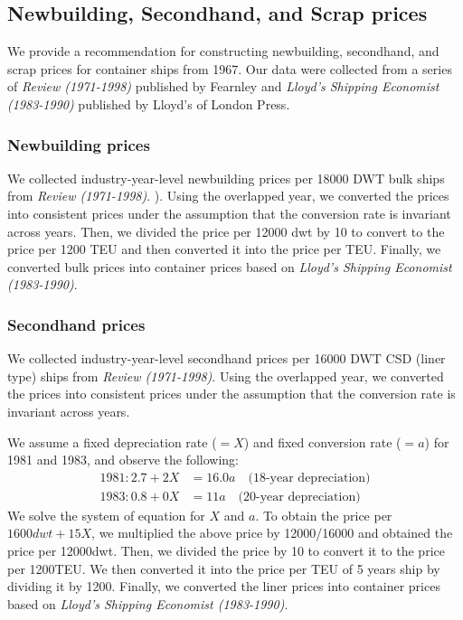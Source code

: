 \subsection{Newbuilding, Secondhand, and Scrap prices}
We provide a recommendation for constructing newbuilding, secondhand, and scrap prices for container ships from 1967. Our data were collected from a series of \textit{Review (1971-1998)} published by Fearnley and \textit{Lloyd's Shipping Economist (1983-1990)} published by Lloyd's of London Press. 

\subsubsection{Newbuilding prices}
We collected industry-year-level newbuilding prices per 18000 DWT bulk ships from \textit{Review (1971-1998)}. ). Using the overlapped year, we converted the prices into consistent prices under the assumption that the conversion rate is invariant across years. Then, we divided the price per 12000 dwt by 10 to convert to the price per 1200 TEU and then converted it into the price per TEU. Finally, we converted bulk prices into container prices based on \textit{Lloyd's Shipping Economist (1983-1990)}.

\subsubsection{Secondhand prices}
We collected industry-year-level secondhand prices per 16000 DWT CSD (liner type) ships from \textit{Review (1971-1998)}. Using the overlapped year, we converted the prices into consistent prices under the assumption that the conversion rate is invariant across years.

We assume a fixed depreciation rate ($= X$) and fixed conversion rate ($= a$) for 1981 and 1983, and observe the following:
\begin{align*}
    1981: 2.7 + 2X &= 16.0a \quad\text{(18-year depreciation)}\\
    1983: 0.8 + 0X &=11a \quad\text{(20-year depreciation)}
\end{align*}
We solve the system of equation for $X$ and $a$. To obtain the price per $1600dwt+15X$, we multiplied the above price by 12000/16000 and obtained the price per 12000dwt. Then, we divided the price by 10 to convert it to the price per 1200TEU. We then converted it into the price per TEU of 5 years ship by dividing it by 1200. Finally, we converted the liner prices into container prices based on \textit{Lloyd's Shipping Economist (1983-1990)}.



